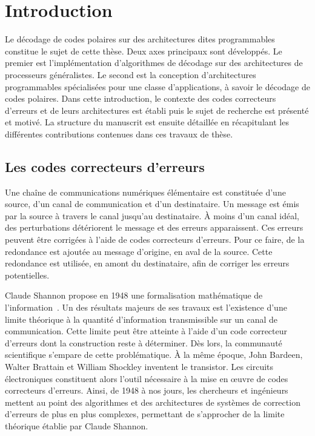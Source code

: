 \chapter*{Introduction}

Le décodage de codes polaires sur des architectures dites programmables constitue le sujet de cette thèse. Deux axes principaux sont développés. Le premier est l'implémentation d'algorithmes de décodage sur des architectures de processeurs généralistes. Le second est la conception d'architectures programmables spécialisées pour une classe d'applications, à savoir le décodage de codes polaires. Dans cette introduction, le contexte des codes correcteurs d'erreurs et de leurs architectures est établi puis le sujet de recherche est présenté et motivé. La structure du manuscrit est ensuite détaillée en récapitulant les différentes contributions contenues dans ces travaux de thèse.

\section*{Les codes correcteurs d'erreurs}

Une chaîne de communications numériques élémentaire est constituée d'une source, d'un canal de communication et d'un destinataire. Un message est émis par la source à travers le canal jusqu'au destinataire. \`A moins d'un canal idéal, des perturbations détériorent le message et des erreurs apparaissent. Ces erreurs peuvent être corrigées à l'aide de codes correcteurs d'erreurs. Pour ce faire, de la redondance est ajoutée au message d'origine, en aval de la source. Cette redondance est utilisée, en amont du destinataire, afin de corriger les erreurs potentielles.

Claude Shannon propose en 1948 une formalisation mathématique de l'information~\cite{shannon_mathematical_2001}. Un des résultats majeurs de ses travaux est l’existence d'une limite théorique à la quantité d'information transmissible sur un canal de communication. Cette limite peut être atteinte à l'aide d'un code correcteur d'erreurs dont la construction reste à déterminer.
Dès lors, la communauté scientifique s'empare de cette problématique.
\`A la même époque, John Bardeen, Walter Brattain et William Shockley inventent le transistor. Les circuits électroniques constituent alors l'outil nécessaire à la mise en œuvre de codes correcteurs d'erreurs. Ainsi, de 1948 à nos jours, les chercheurs et ingénieurs mettent au point des algorithmes et des architectures de systèmes de correction d'erreurs de plus en plus complexes, permettant de s'approcher de la limite théorique établie par Claude Shannon.


